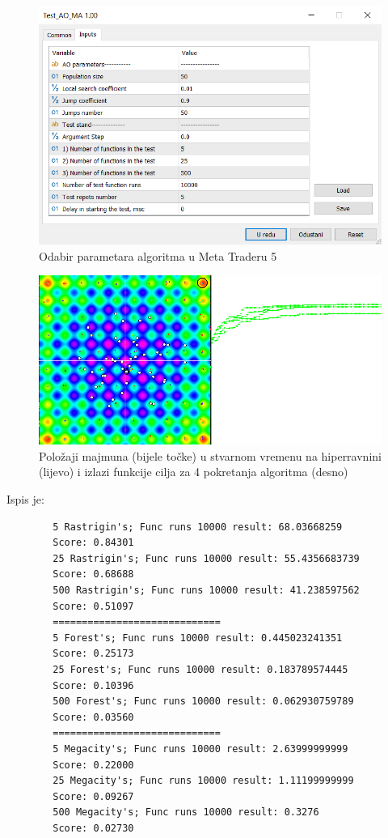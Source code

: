 \begin{figure}[H]
	\centering
	\includegraphics[width=14cm]{mt51}
	\caption{Odabir parametara algoritma u Meta Traderu 5} 
	
\end{figure}

\begin{figure}[H]
	\centering
	\includegraphics[width=14cm]{mt52}
	\caption{Položaji majmuna (bijele točke) u stvarnom vremenu na hiperravnini (lijevo) i izlazi funkcije cilja za 4 pokretanja algoritma (desno)}
	\centering
	
\end{figure}

\noindent Ispis je:
\begin{framed}
	\begin{verbatim}
		5 Rastrigin's; Func runs 10000 result: 68.03668259
		Score: 0.84301
		25 Rastrigin's; Func runs 10000 result: 55.4356683739
		Score: 0.68688
		500 Rastrigin's; Func runs 10000 result: 41.238597562
		Score: 0.51097
		=============================
		5 Forest's; Func runs 10000 result: 0.445023241351
		Score: 0.25173
		25 Forest's; Func runs 10000 result: 0.183789574445
		Score: 0.10396
		500 Forest's; Func runs 10000 result: 0.062930759789
		Score: 0.03560
		=============================
		5 Megacity's; Func runs 10000 result: 2.63999999999
		Score: 0.22000
		25 Megacity's; Func runs 10000 result: 1.11199999999
		Score: 0.09267
		500 Megacity's; Func runs 10000 result: 0.3276
		Score: 0.02730
	\end{verbatim}
\end{framed}

